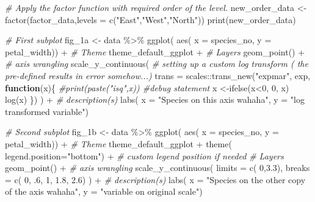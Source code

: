 \documentclass[]{elsarticle} %
\newenvironment{Shaded}{\begin{snugshade}}{\end{snugshade}}
\newcommand{\AttributeTok}[1]{\textcolor[rgb]{0.77,0.63,0.00}{#1}}
\newcommand{\CommentTok}[1]{\textcolor[rgb]{0.56,0.35,0.01}{\textit{#1}}}
\newcommand{\ControlFlowTok}[1]{\textcolor[rgb]{0.13,0.29,0.53}{\textbf{#1}}}
\newcommand{\DecValTok}[1]{\textcolor[rgb]{0.00,0.00,0.81}{#1}}
\newcommand{\FloatTok}[1]{\textcolor[rgb]{0.00,0.00,0.81}{#1}}
\newcommand{\FunctionTok}[1]{\textcolor[rgb]{0.00,0.00,0.00}{#1}}
\newcommand{\NormalTok}[1]{#1}
\newcommand{\OtherTok}[1]{\textcolor[rgb]{0.56,0.35,0.01}{#1}}
\newcommand{\SpecialCharTok}[1]{\textcolor[rgb]{0.00,0.00,0.00}{#1}}
\newcommand{\StringTok}[1]{\textcolor[rgb]{0.31,0.60,0.02}{#1}}
\begin{document}
\begin{Shaded}
\begin{Highlighting}[]
\CommentTok{\# Apply the factor function with required order of the level.}
\NormalTok{new\_order\_data }\OtherTok{\textless{}{-}} \FunctionTok{factor}\NormalTok{(factor\_data,}\AttributeTok{levels =} \FunctionTok{c}\NormalTok{(}\StringTok{"East"}\NormalTok{,}\StringTok{"West"}\NormalTok{,}\StringTok{"North"}\NormalTok{))}
\FunctionTok{print}\NormalTok{(new\_order\_data)}



\CommentTok{\# First subplot}
\NormalTok{fig\_1a }\OtherTok{\textless{}{-}} 
\NormalTok{data }\SpecialCharTok{\%\textgreater{}\%}
  \FunctionTok{ggplot}\NormalTok{( }\FunctionTok{aes}\NormalTok{( }\AttributeTok{x =}\NormalTok{ species\_no,}
               \AttributeTok{y =}\NormalTok{ petal\_width)) }\SpecialCharTok{+}
  \CommentTok{\# Theme}
\NormalTok{  theme\_default\_ggplot }\SpecialCharTok{+}
  \CommentTok{\# Layers}
  \FunctionTok{geom\_point}\NormalTok{() }\SpecialCharTok{+}
  \CommentTok{\# axis wrangling}
  \FunctionTok{scale\_y\_continuous}\NormalTok{( }
    \CommentTok{\# setting up a custom log transform ( the pre{-}defined results in error somehow...)}
    \AttributeTok{trans =}\NormalTok{ scales}\SpecialCharTok{::}\FunctionTok{trans\_new}\NormalTok{(}\StringTok{"expmar"}\NormalTok{, exp,}
            \ControlFlowTok{function}\NormalTok{(x)\{}
                \CommentTok{\#print(paste("isq",x))  \#debug statement}
\NormalTok{                x }\OtherTok{\textless{}{-}}\FunctionTok{ifelse}\NormalTok{(x}\SpecialCharTok{\textless{}}\DecValTok{0}\NormalTok{, }\DecValTok{0}\NormalTok{, x)}
                \FunctionTok{log}\NormalTok{(x)}
\NormalTok{              \})}
\NormalTok{  ) }\SpecialCharTok{+}
  \CommentTok{\# description(s)}
  \FunctionTok{labs}\NormalTok{( }\AttributeTok{x =} \StringTok{"Species on this axis wahaha"}\NormalTok{,}
        \AttributeTok{y =} \StringTok{"log transformed variable"}\NormalTok{)}


\CommentTok{\# Second subplot}
\NormalTok{fig\_1b }\OtherTok{\textless{}{-}} 
\NormalTok{data }\SpecialCharTok{\%\textgreater{}\%}
  \FunctionTok{ggplot}\NormalTok{( }\FunctionTok{aes}\NormalTok{( }\AttributeTok{x =}\NormalTok{ species\_no,}
               \AttributeTok{y =}\NormalTok{ petal\_width)) }\SpecialCharTok{+}
  \CommentTok{\# Theme}
\NormalTok{  theme\_default\_ggplot }\SpecialCharTok{+}
  \FunctionTok{theme}\NormalTok{( }\AttributeTok{legend.position=}\StringTok{"bottom"}\NormalTok{) }\SpecialCharTok{+} \CommentTok{\# custom legend position if needed}
  \CommentTok{\# Layers}
  \FunctionTok{geom\_point}\NormalTok{() }\SpecialCharTok{+}
  \CommentTok{\# axis wrangling}
  \FunctionTok{scale\_y\_continuous}\NormalTok{( }
    \AttributeTok{limits =} \FunctionTok{c}\NormalTok{( }\DecValTok{0}\NormalTok{,}\FloatTok{3.3}\NormalTok{),}
    \AttributeTok{breaks =} \FunctionTok{c}\NormalTok{( }\DecValTok{0}\NormalTok{, .}\DecValTok{6}\NormalTok{, }\DecValTok{1}\NormalTok{, }\FloatTok{1.8}\NormalTok{, }\FloatTok{2.6}\NormalTok{)}
\NormalTok{  ) }\SpecialCharTok{+}
  \CommentTok{\# description(s)}
  \FunctionTok{labs}\NormalTok{( }\AttributeTok{x =} \StringTok{"Species on the other copy of the axis wahaha"}\NormalTok{,}
        \AttributeTok{y =} \StringTok{"variable on original scale"}\NormalTok{)}


\end{Highlighting}
\end{Shaded}
\end{document}
